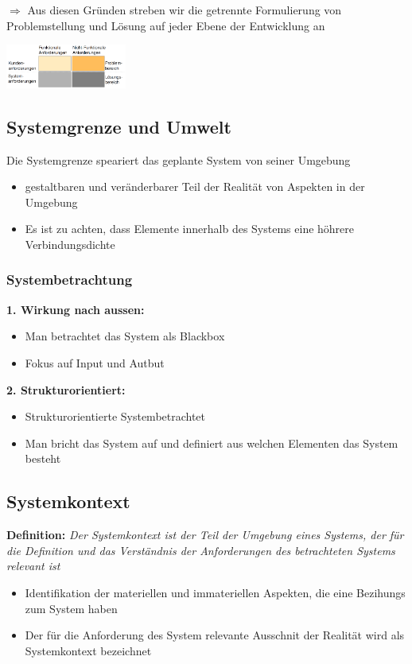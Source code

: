 \documentclass{report}
\newenvironment{Figure}
	{\par\medskip\noindent\minipage{\linewidth}}
	{\endminipage\par\medskip}
\theoremstyle{definition}
\theoremstyle{example}
\begin{document}
$\Rightarrow$ Aus diesen Gründen streben wir die getrennte Formulierung von Problemstellung und Lösung auf jeder Ebene der Entwicklung an
\begin{Figure}
   \centering
    \includegraphics[width=150px]{img/FormulierungProblemstellung.png}
        \label{fig:Formulierung Problemstellung}
\end{Figure}

\subsection{Systemgrenze und Umwelt}
Die Systemgrenze speariert das geplante System von seiner Umgebung
\begin{itemize}
   \item gestaltbaren und veränderbarer Teil der Realität von Aspekten in der Umgebung
   \item Es ist zu achten, dass Elemente innerhalb des Systems eine höhrere Verbindungsdichte
\end{itemize}

\subsubsection{Systembetrachtung}
\textbf{1. Wirkung nach aussen:}
\begin{itemize}
   \item Man betrachtet das System als Blackbox
   \item Fokus auf Input und Autbut
\end{itemize}

\textbf{2. Strukturorientiert:}
\begin{itemize}
   \item Strukturorientierte Systembetrachtet
   \item Man bricht das System auf und definiert aus welchen Elementen das System besteht
\end{itemize}

\subsection{Systemkontext}
\textbf{Definition:} \textit{Der Systemkontext ist der Teil der Umgebung eines Systems, der für die Definition und das Verständnis der Anforderungen des betrachteten Systems relevant ist}
\begin{itemize}
   \item Identifikation der materiellen und immateriellen Aspekten, die eine Bezihungs zum System haben 
   \item Der für die Anforderung des System relevante Ausschnit der Realität wird als Systemkontext bezeichnet
\end{itemize}
\end{document}
